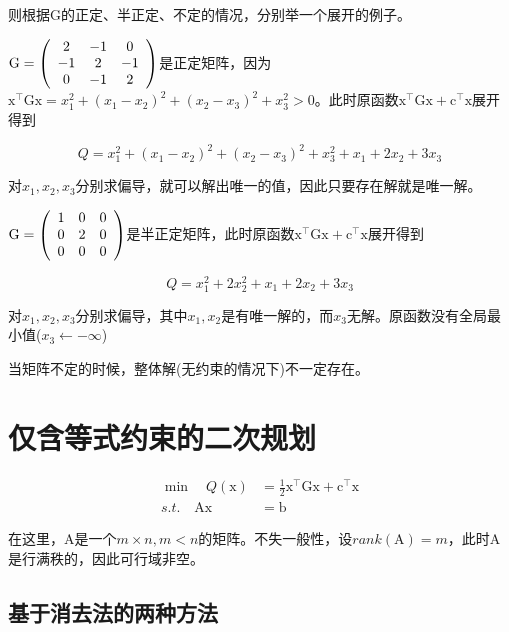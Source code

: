 \documentclass[a4paper]{D:/repositories/MyDGP/latex/PaperReadingLog}
\begin{document}
则根据$\mathrm{G}$的正定、半正定、不定的情况，分别举一个展开的例子。

$\mathrm{G}=\left(\begin{array}[]{ccc}
        2 & -1 & 0 \\
        -1 & 2 & -1 \\
        0 & -1 & 2 \\
    \end{array}
    \right)
    $是正定矩阵，因为$\mathrm{x}^\top\mathrm{G}\mathrm{x}=x_1^2+(x_1-x_2)^2+(x_2-x_3)^2+x_3^2>0$。此时原函数$\mathrm{x}^\top\mathrm{G}\mathrm{x}+\mathrm{c}^\top\mathrm{x}$展开得到

    $$
    Q=x_1^2+(x_1-x_2)^2+(x_2-x_3)^2+x_3^2+x_1+2x_2+3x_3
    $$

    对$x_1,x_2,x_3$分别求偏导，就可以解出唯一的值，因此只要存在解就是唯一解。

    $\mathrm{G}=\left(\begin{array}[]{ccc}
        1 & 0 & 0 \\
        0 & 2 & 0 \\
        0 & 0 & 0 \\
    \end{array}
    \right)
    $是半正定矩阵，此时原函数$\mathrm{x}^\top\mathrm{G}\mathrm{x}+\mathrm{c}^\top\mathrm{x}$展开得到

    $$
    Q=x_1^2+2x_2^2+x_1+2x_2+3x_3
    $$

    对$x_1,x_2,x_3$分别求偏导，其中$x_1,x_2$是有唯一解的，而$x_3$无解。原函数没有全局最小值($x_3\leftarrow-\infty$)

    当矩阵不定的时候，整体解(无约束的情况下)不一定存在。

\section{仅含等式约束的二次规划}
$$
\begin{aligned}
    \min\quad Q(\mathrm{x})&=\frac{1}{2}\mathrm{x}^\top\mathrm{G}\mathrm{x}+\mathrm{c}^\top\mathrm{x}\\
    s.t.\quad \mathrm{A}\mathrm{x}&=\mathrm{b}
\end{aligned}
$$

在这里，$\mathrm{A}$是一个$m\times n,m<n$的矩阵。不失一般性，设$rank(\mathrm{A})=m$，此时$\mathrm{A}$是行满秩的，因此可行域非空。

\subsection{基于消去法的两种方法}
\end{document}
